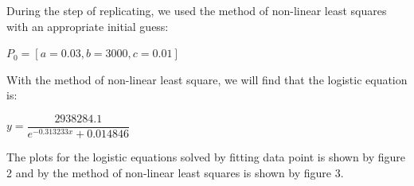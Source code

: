 \documentclass[a4paper]{article}
\begin{document}
During the step of replicating, we used the method of non-linear least squares with an appropriate initial guess: \

\begin{center}

$P_0 = [a=0.03, b=3000, c=0.01]$ \

\end{center}

With the method of non-linear least square, we will find that the logistic equation is: \

\begin{center}

$y = \dfrac{2938284.1}{e^{-0.313233x}+0.014846}$ \\

\end{center}

\vspace{0.4cm}

The plots for the logistic equations solved by fitting data point is shown by figure 2 and by the method of non-linear least squares is shown by figure 3. \

\clearpage
\end{document}
